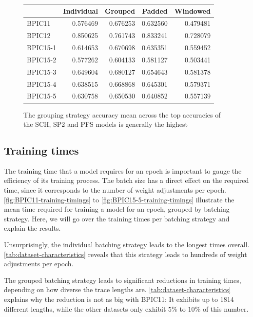 \begin{figure}
\centering
\begin{tabular}{l|rrrr}
&  Individual &   Grouped &    Padded &  Windowed \\
\midrule
BPIC11   &    0.576469 &  0.676253 &  0.632560 &  0.479481 \\
BPIC12   &    0.850625 &  0.761743 &  0.833241 &  0.728079 \\
BPIC15-1 &    0.614653 &  0.670698 &  0.635351 &  0.559452 \\
BPIC15-2 &    0.577262 &  0.604133 &  0.581127 &  0.503441 \\
BPIC15-3 &    0.649604 &  0.680127 &  0.654643 &  0.581378 \\
BPIC15-4 &    0.638515 &  0.668868 &  0.645301 &  0.579371 \\
BPIC15-5 &    0.630758 &  0.650530 &  0.640852 &  0.557139 \\
\end{tabular}
\caption[Grouping strategy leads to best mean accuracies]{The grouping strategy accuracy mean across the top accuracies of the SCH, SP2 and PFS models is generally the highest}
\label{tab:strategy-top-accuracies}
\end{figure}
\FloatBarrier

\subsection*{Training times}
The training time that a model requires for an epoch is important to gauge the efficiency of its training process. The batch size has a direct effect on the required time, since it corresponds to the number of weight adjustments per epoch. \autoref{fig:BPIC11-training-timings} to \autoref{fig:BPIC15-5-training-timings} illustrate the mean time required for training a model for an epoch, grouped by batching strategy. Here, we will go over the training times per batching strategy and explain the results.

Unsurprisingly, the individual batching strategy leads to the longest times overall. \autoref{tab:dataset-characteristics} reveals that this strategy leads to hundreds of weight adjustments per epoch.

The grouped batching strategy leads to significant reductions in training times, depending on how diverse the trace lengths are. \autoref{tab:dataset-characteristics} explains why the reduction is not as big with BPIC11: It exhibits up to 1814 different lengths, while the other datasets only exhibit $5\%$ to $10\%$ of this number.

